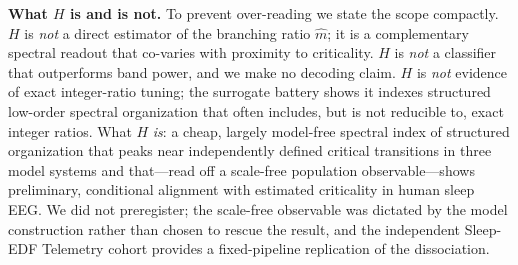 \documentclass[11pt]{article}
\begin{document}
\textbf{What $H$ is and is not.} To prevent over-reading we state the scope compactly. $H$ is \emph{not} a direct estimator of the branching ratio $\hat m$; it is a complementary spectral readout that co-varies with proximity to criticality. $H$ is \emph{not} a classifier that outperforms band power, and we make no decoding claim. $H$ is \emph{not} evidence of exact integer-ratio tuning; the surrogate battery shows it indexes structured low-order spectral organization that often includes, but is not reducible to, exact integer ratios. What $H$ \emph{is}: a cheap, largely model-free spectral index of structured organization that peaks near independently defined critical transitions in three model systems and that---read off a scale-free population observable---shows preliminary, conditional alignment with estimated criticality in human sleep EEG. We did not preregister; the scale-free observable was dictated by the model construction rather than chosen to rescue the result, and the independent Sleep-EDF Telemetry cohort provides a fixed-pipeline replication of the dissociation.
\end{document}
